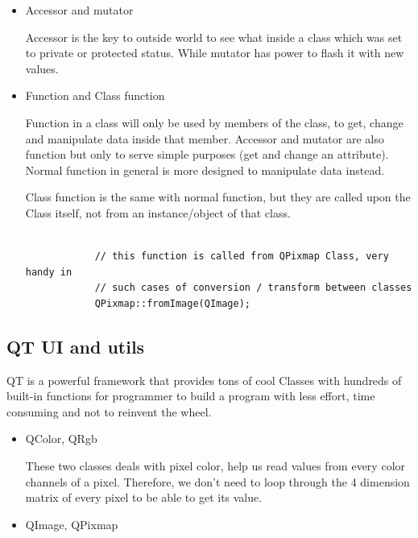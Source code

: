 \documentclass[english]{article}
\begin{document}
{\begin{itemize}
		The Attribute could be created at the same time when the instance was born by passing values onto Constructor
		  
		\item Accessor and mutator
		
		Accessor is the key to outside world to see what inside a class which was set to private or protected status. While mutator has power to flash it with new values. 
		
		\item Function and Class function
		
		Function in a class will only be used by members of the class, to get, change and manipulate data inside that member. Accessor and mutator are also function but only to serve simple purposes (get and change an attribute). Normal function in general is more designed to manipulate data instead.
		
		Class function is the same with normal function, but they are called upon the Class itself, not from an instance/object of that class. 
		
		\lstset{language=C++}
		\begin{lstlisting}
		
			// this function is called from QPixmap Class, very handy in
			// such cases of conversion / transform between classes
			QPixmap::fromImage(QImage);
		\end{lstlisting}
		
	\end{itemize}



\subsection{QT UI and utils}

	QT is a powerful framework that provides tons of cool Classes with hundreds of built-in functions for programmer to build a program with less effort, time consuming and not to reinvent the wheel.

	\begin{itemize}
		\item QColor, QRgb
		
		These two classes deals with pixel color, help us read values from every color channels of a pixel. Therefore, we don't need to loop through the 4 dimension matrix of every pixel to be able to get its value.
		
		\item QImage, QPixmap
		

\end{itemize}}
\end{document}
